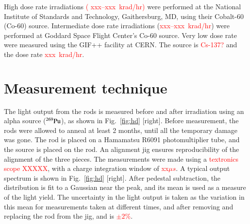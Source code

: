 \documentclass[review]{elsarticle}
\begin{document}
High dose rate irradiations \textcolor{red}{( xxx--xxx~krad/hr)}
were performed at the National Institute of Standards and Technology, Gaithersburg, MD, using their Cobalt-60 (Co-60) source.  Intermediate dose rate irradiations (\textcolor{red}{xxx--xxx~krad/hr}) were performed at Goddard Space Flight Center's Co-60 source.  Very low dose rate were measured using the GIF++ facility\cite{gif} at CERN.  The source is \textcolor{red}{Cs-137?} and the dose rate \textcolor{red}{xxx~krad/hr}.

\section{Measurement technique}
The light output from the rods is measured before and after
irradiation using an alpha source (${\rm ^{269}Pu}$), as shown in Fig.~\ref{fig:hd} [right].
Before measurement, the rods were allowed to anneal
at least 2 months,  until all the temporary damage was gone.
The rod is placed on a Hamamatsu R6091 photomultiplier tube, and the
source is placed on the rod.  An alignment jig ensures reproducibility
of the alignment of the three pieces.  The measurements were made using
a \textcolor{red}{textronics scope XXXXX}, with a charge integration
window of \textcolor{red}{xx$\mu s$}.
A typical output spectrum is shown in Fig.~\ref{fig:hd} [right].
After pedestal subtraction, the distribution is fit to a Gaussian near the peak, and its mean is used as a measure of the light yield.  The uncertainty in the light output is taken as the variation in this mean for measurements taken at different times, and after removing and replacing the rod from the jig, and is
\textcolor{red}{$\pm 2$\%}.
\end{document}
